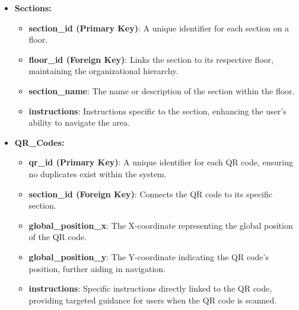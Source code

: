 \begin{itemize}
	\item \textbf{Sections:}
	\begin{itemize}
		\item \textbf{section\_id (Primary Key)}: A unique identifier for each section on a floor.
		\item \textbf{floor\_id (Foreign Key)}: Links the section to its respective floor, maintaining the organizational hierarchy.
		\item \textbf{section\_name}: The name or description of the section within the floor.
		\item \textbf{instructions}: Instructions specific to the section, enhancing the user’s ability to navigate the area.
	\end{itemize}
	
	\item \textbf{QR\_Codes:}
	\begin{itemize}
		\item \textbf{qr\_id (Primary Key)}: A unique identifier for each QR code, ensuring no duplicates exist within the system.
		\item \textbf{section\_id (Foreign Key)}: Connects the QR code to its specific section.
		\item \textbf{global\_position\_x}: The X-coordinate representing the global position of the QR code.
		\item \textbf{global\_position\_y}: The Y-coordinate indicating the QR code's position, further aiding in navigation.
		\item \textbf{instructions}: Specific instructions directly linked to the QR code, providing targeted guidance for users when the QR code is scanned.
	\end{itemize}
\end{itemize}

